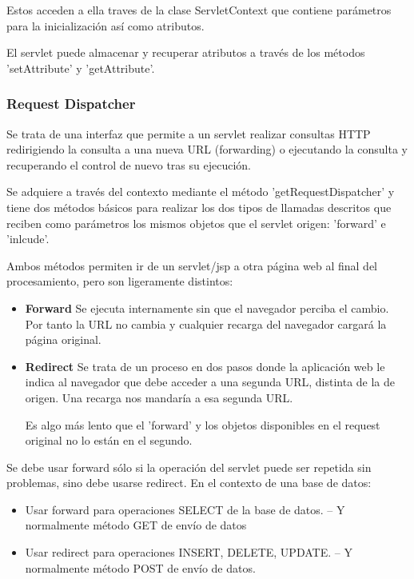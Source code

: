 \documentclass{apuntes}
\begin{document}
Estos acceden a ella traves de la clase ServletContext que contiene parámetros para la inicialización así como atributos.

El servlet puede almacenar y recuperar atributos a través de los métodos 'setAttribute' y 'getAttribute'.

\subsubsection{Request Dispatcher}
Se trata de una interfaz que permite a un servlet realizar consultas HTTP redirigiendo la consulta a una nueva URL (forwarding) o ejecutando la consulta y recuperando el control de nuevo tras su ejecución.

Se adquiere a través del contexto mediante el método 'getRequestDispatcher' y tiene dos métodos básicos para realizar los dos tipos de llamadas descritos que reciben como parámetros los mismos objetos que el servlet origen: 'forward' e 'inlcude'.

Ambos métodos permiten ir de un servlet/jsp a otra página web al final del procesamiento, pero son ligeramente distintos:
\begin{itemize}
\item \textbf{Forward}
Se ejecuta internamente sin que el navegador perciba el cambio. Por tanto la URL no cambia y cualquier recarga del navegador cargará la página original.
\item \textbf{Redirect}
Se trata de un proceso en dos pasos donde la aplicación web le indica al navegador que debe acceder a una segunda URL, distinta de la de origen. Una recarga nos mandaría a esa segunda URL.

Es algo más lento que el 'forward' y los objetos disponibles en el request original no lo están en el segundo.
\end{itemize}

Se debe usar forward sólo si la operación del servlet puede ser repetida sin problemas, sino debe usarse redirect. En el contexto de una base de datos:
\begin{itemize}
\item Usar forward para operaciones SELECT de la base de datos.
– Y normalmente método GET de envío de datos
\item Usar redirect para operaciones INSERT, DELETE, UPDATE.
– Y normalmente método POST de envío de datos.
\end{itemize}
\end{document}
